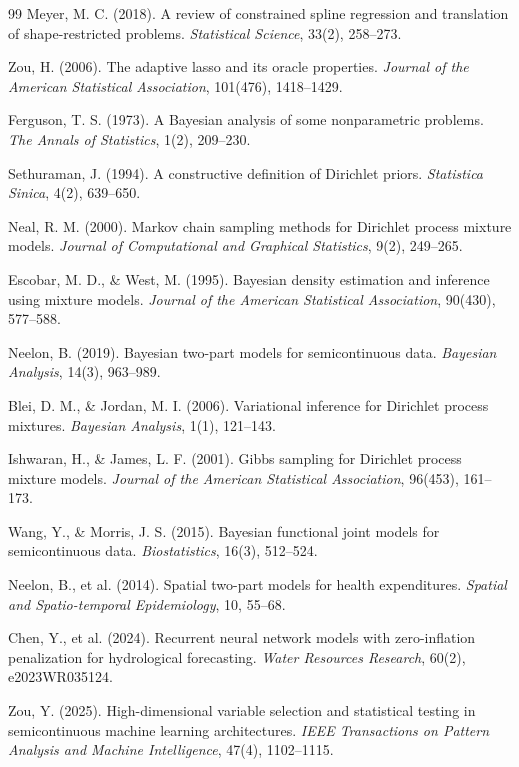 \begin{thebibliography}{99}
Meyer, M. C. (2018). A review of constrained spline regression and translation of shape-restricted problems. \emph{Statistical Science}, 33(2), 258--273.

Zou, H. (2006). The adaptive lasso and its oracle properties. \emph{Journal of the American Statistical Association}, 101(476), 1418--1429.

Ferguson, T. S. (1973). A Bayesian analysis of some nonparametric problems. \emph{The Annals of Statistics}, 1(2), 209--230.

Sethuraman, J. (1994). A constructive definition of Dirichlet priors. \emph{Statistica Sinica}, 4(2), 639--650.

Neal, R. M. (2000). Markov chain sampling methods for Dirichlet process mixture models. \emph{Journal of Computational and Graphical Statistics}, 9(2), 249--265.

Escobar, M. D., \& West, M. (1995). Bayesian density estimation and inference using mixture models. \emph{Journal of the American Statistical Association}, 90(430), 577--588.

Neelon, B. (2019). Bayesian two-part models for semicontinuous data. \emph{Bayesian Analysis}, 14(3), 963--989.

Blei, D. M., \& Jordan, M. I. (2006). Variational inference for Dirichlet process mixtures. \emph{Bayesian Analysis}, 1(1), 121--143.

Ishwaran, H., \& James, L. F. (2001). Gibbs sampling for Dirichlet process mixture models. \emph{Journal of the American Statistical Association}, 96(453), 161--173.

Wang, Y., \& Morris, J. S. (2015). Bayesian functional joint models for semicontinuous data. \emph{Biostatistics}, 16(3), 512--524.

Neelon, B., et al. (2014). Spatial two-part models for health expenditures. \emph{Spatial and Spatio-temporal Epidemiology}, 10, 55--68.

Chen, Y., et al. (2024). Recurrent neural network models with zero-inflation penalization for hydrological forecasting. \emph{Water Resources Research}, 60(2), e2023WR035124.

Zou, Y. (2025). High-dimensional variable selection and statistical testing in semicontinuous machine learning architectures. \emph{IEEE Transactions on Pattern Analysis and Machine Intelligence}, 47(4), 1102--1115.


\end{thebibliography}
